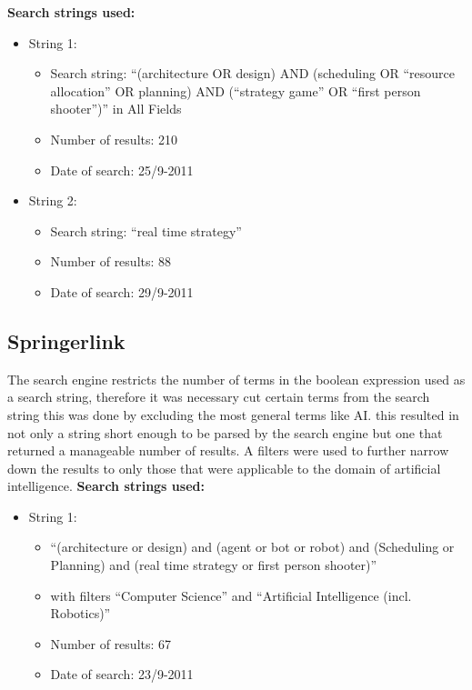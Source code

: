 \textbf{Search strings used:}
\begin{itemize}
\item String 1:
\begin{itemize}
\item Search string:  ``(architecture OR design) AND (scheduling OR ``resource allocation'' OR planning) AND (``strategy game'' OR ``first person shooter'')'' in All Fields
\item Number of results: 210
\item Date of search: 25/9-2011
\end{itemize}
\item String 2:
\begin{itemize}
\item Search string: ``real time strategy''
\item Number of results: 88
\item Date of search: 29/9-2011
\end{itemize}
\end{itemize}

\subsection{Springerlink}
\label{sub:springerlink}
The search engine restricts the number of terms in the boolean expression used as a search string, therefore it was necessary cut certain terms from the search string this was done by excluding the most general terms like AI. this resulted in not only a string short enough to be parsed by the search engine but one that returned a manageable number of results. A filters were used to further narrow down the results to only those that were applicable to the domain of artificial intelligence. 
\textbf{Search strings used:}
\begin{itemize}
\item String 1:
\begin{itemize}
\item ``(architecture or design) and (agent or bot or robot) and (Scheduling or Planning) and (real time strategy or first person shooter)''
\item with filters ``Computer Science'' and ``Artificial Intelligence (incl. Robotics)''
\item Number of results: 67
\item Date of search: 23/9-2011
\end{itemize}
\end{itemize}


